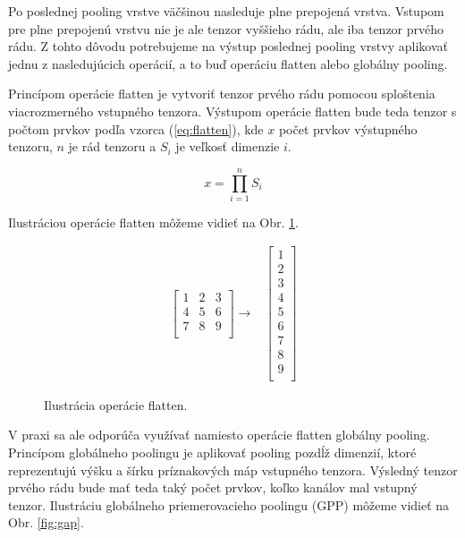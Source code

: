 Po poslednej pooling vrstve väčšinou nasleduje plne prepojená vrstva. Vstupom pre
plne prepojenú vrstvu nie je ale tenzor vyššieho rádu, ale iba tenzor prvého rádu. Z
tohto dôvodu potrebujeme na výstup poslednej pooling vrstvy aplikovať jednu z nasledujúcich operácií, a to buď operáciu flatten alebo globálny pooling.


Princípom operácie flatten je vytvoriť tenzor prvého rádu pomocou sploštenia viacrozmerného vstupného tenzora. Výstupom operácie flatten bude teda tenzor s počtom prvkov podľa vzorca (\ref{eq:flatten}), kde $x$ počet prvkov výstupného tenzoru, $n$ je rád tenzoru
a $S_i$ je veľkosť dimenzie $i$.

\begin{equation}
x = \prod_{i=1}^{n} S_i
\label{eq:flatten}
\end{equation}

Ilustráciou operácie flatten môžeme vidieť na Obr. \ref{fig:flatten}.

\begin{figure}[H]
\begin{align*}
  \begin{bmatrix}
      1 & 2 & 3 \\
      4 & 5 & 6 \\
      7 & 8 & 9 \\
  \end{bmatrix}
  \longrightarrow 
  &
  \begin{bmatrix}
      1 \\
      2 \\
      3 \\
      4 \\
      5 \\
      6 \\
      7 \\
      8 \\
      9 \\
  \end{bmatrix}
\end{align*}
\caption{Ilustrácia operácie flatten.}
\label{fig:flatten}
\end{figure}

V praxi sa ale odporúča využívať namiesto operácie flatten globálny pooling. Princípom globálneho poolingu je aplikovať pooling pozdĺž dimenzií, ktoré reprezentujú
výšku a šírku príznakových máp vstupného tenzora. Výsledný tenzor prvého
rádu bude mať teda taký počet prvkov, koľko kanálov mal vstupný tenzor. Ilustráciu
globálneho priemerovacieho poolingu (GPP) môžeme vidieť na Obr. \ref{fig:gap}.

